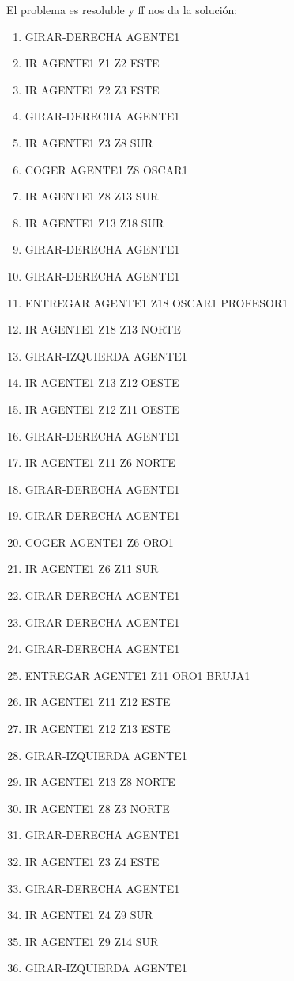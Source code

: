 \documentclass[12pt,a4paper]{article}
\begin{document}
El problema es resoluble y ff nos da la solución:
\begin{enumerate}
	\item GIRAR-DERECHA AGENTE1
	\item IR AGENTE1 Z1 Z2 ESTE
	\item IR AGENTE1 Z2 Z3 ESTE
	\item GIRAR-DERECHA AGENTE1
	\item IR AGENTE1 Z3 Z8 SUR
	\item COGER AGENTE1 Z8 OSCAR1
	\item IR AGENTE1 Z8 Z13 SUR
	\item IR AGENTE1 Z13 Z18 SUR
	\item GIRAR-DERECHA AGENTE1
	\item GIRAR-DERECHA AGENTE1
	\item ENTREGAR AGENTE1 Z18 OSCAR1 PROFESOR1
	\item IR AGENTE1 Z18 Z13 NORTE
	\item GIRAR-IZQUIERDA AGENTE1
	\item IR AGENTE1 Z13 Z12 OESTE
	\item IR AGENTE1 Z12 Z11 OESTE
	\item GIRAR-DERECHA AGENTE1
	\item IR AGENTE1 Z11 Z6 NORTE
	\item GIRAR-DERECHA AGENTE1
	\item GIRAR-DERECHA AGENTE1
	\item COGER AGENTE1 Z6 ORO1
	\item IR AGENTE1 Z6 Z11 SUR
	\item GIRAR-DERECHA AGENTE1
	\item GIRAR-DERECHA AGENTE1
	\item GIRAR-DERECHA AGENTE1
	\item ENTREGAR AGENTE1 Z11 ORO1 BRUJA1
	\item IR AGENTE1 Z11 Z12 ESTE
	\item IR AGENTE1 Z12 Z13 ESTE
	\item GIRAR-IZQUIERDA AGENTE1
	\item IR AGENTE1 Z13 Z8 NORTE
	\item IR AGENTE1 Z8 Z3 NORTE
	\item GIRAR-DERECHA AGENTE1
	\item IR AGENTE1 Z3 Z4 ESTE
	\item GIRAR-DERECHA AGENTE1
	\item IR AGENTE1 Z4 Z9 SUR
	\item IR AGENTE1 Z9 Z14 SUR
	\item GIRAR-IZQUIERDA AGENTE1

\end{enumerate}
\end{document}
